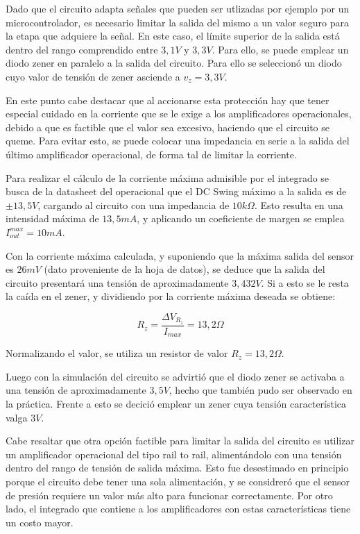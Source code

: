 Dado que el circuito adapta se\~nales que pueden ser utlizadas por ejemplo por un microcontrolador, es necesario limitar la salida del mismo a un valor seguro para la etapa que adquiere la se\~nal. En este caso, el l\'imite superior de la salida est\'a dentro del rango comprendido entre $3,1V$ y $3,3V$. Para ello, se puede emplear un diodo zener en paralelo a la salida del circuito. Para ello se seleccion\'o un diodo cuyo valor de tensi\'on de zener asciende a $v_z = 3,3V$.


En este punto cabe destacar que al accionarse esta protecci\'on hay que tener especial cuidado en la corriente que se le exige a los amplificadores operacionales, debido a que es factible que el valor sea excesivo, haciendo que el circuito se queme. Para evitar esto, se puede colocar una impedancia en serie a la salida del \'ultimo amplificador operacional, de forma tal de limitar la corriente.


Para realizar el c\'alculo de la corriente m\'axima admisible por el integrado se busca de la datasheet del operacional que el DC Swing m\'aximo a la salida es de $\pm 13,5V$, cargando al circuito con una impedancia de $10k\Omega$. Esto resulta en una intensidad m\'axima de $13,5mA$, y aplicando un coeficiente de margen se emplea $I_{out}^{max} = 10mA$.

Con la corriente m\'axima calculada, y suponiendo que la m\'axima salida del sensor es $26mV$ (dato proveniente de la hoja de datos), se deduce que la salida del circuito presentar\'a una tensi\'on de aproximadamente $3,432V$. Si a esto se le resta la ca\'ida en el zener, y dividiendo por la corriente m\'axima deseada se obtiene:

\begin{equation}
R_z = \frac{\Delta V_{R_z}}{I_{max}} = 13,2 \Omega
\end{equation}

Normalizando el valor, se utiliza un resistor de valor $R_z = 13,2 \Omega$.

Luego con la simulaci\'on del circuito se advirti\'o que el diodo zener se activaba a una tensi\'on de aproximadamente $3,5V$, hecho que tambi\'en pudo ser observado en la pr\'actica. Frente a esto se decici\'o emplear un zener cuya tensi\'on caracter\'istica valga $3V$.

Cabe resaltar que otra opci\'on factible para limitar la salida del circuito es utilizar un amplificador operacional del tipo rail to rail, aliment\'andolo con una tensi\'on dentro del rango de tensi\'on de salida m\'axima. Esto fue desestimado en principio porque el circuito debe tener una sola alimentaci\'on, y se considrer\'o que el sensor de presi\'on requiere un valor m\'as alto para funcionar correctamente. Por otro lado, el integrado que contiene a los amplificadores con estas caracter\'isticas tiene un costo mayor.

